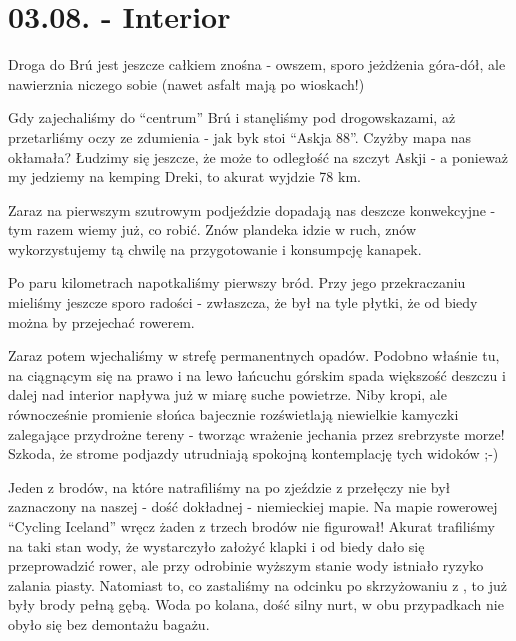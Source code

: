 \chapter*{03.08. - Interior}

Droga do Brú jest jeszcze całkiem znośna - owszem, sporo jeżdżenia góra-dół, ale nawierznia niczego sobie (nawet asfalt mają po wioskach!)

Gdy zajechaliśmy do “centrum” Brú i stanęliśmy pod drogowskazami, aż przetarliśmy oczy ze zdumienia - jak byk stoi “Askja 88”. Czyżby mapa nas okłamała? Łudzimy się jeszcze, że może to odległość na szczyt Askji - a ponieważ my jedziemy na kemping Dreki, to akurat wyjdzie 78 km.

Zaraz na pierwszym szutrowym podjeździe dopadają nas deszcze konwekcyjne - tym razem wiemy już, co robić. Znów plandeka idzie w ruch, znów wykorzystujemy tą chwilę na przygotowanie i konsumpcję kanapek.

Po paru kilometrach napotkaliśmy pierwszy bród. Przy jego przekraczaniu mieliśmy jeszcze sporo radości - zwłaszcza, że był na tyle płytki, że od biedy można by przejechać rowerem.

Zaraz potem wjechaliśmy w strefę permanentnych opadów. Podobno właśnie tu, na ciągnącym się na prawo i na lewo łańcuchu górskim spada większość deszczu i dalej nad interior napływa już w miarę suche powietrze. Niby kropi, ale równocześnie promienie słońca bajecznie rozświetlają niewielkie kamyczki zalegające przydrożne tereny - tworząc wrażenie jechania przez srebrzyste morze! Szkoda, że strome podjazdy utrudniają spokojną kontemplację tych widoków ;-)


Jeden z brodów, na które natrafiliśmy na  po zjeździe z przełęczy nie był zaznaczony na naszej - dość dokładnej - niemieckiej mapie. Na mapie rowerowej “Cycling Iceland” wręcz żaden z trzech brodów nie figurował! Akurat trafiliśmy na taki stan wody, że wystarczyło założyć klapki i od biedy dało się przeprowadzić rower, ale przy odrobinie wyższym stanie wody istniało ryzyko zalania piasty. Natomiast to, co zastaliśmy na odcinku po skrzyżowaniu z , to już były brody pełną gębą. Woda po kolana, dość silny nurt, w obu przypadkach nie obyło się bez demontażu bagażu.


